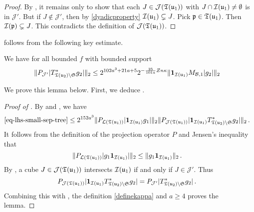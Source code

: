     \begin{proof}\leanok
        By , it remains only to show that each $J \in \mathcal{J}({\mathfrak T}({\mathfrak u}_1))$ with $J \cap {\mathcal{I}}({\mathfrak u}_1) \ne \emptyset$ is in $\mathcal{J}'$. But if $J \notin \mathcal{J}'$, then by \eqref{dyadicproperty} ${\mathcal{I}}({\mathfrak u}_1) \subsetneq J$. Pick ${\mathfrak p} \in {\mathfrak T}({\mathfrak u}_1)$. Then ${\mathcal{I}}({\mathfrak p}) \subsetneq J$. This contradicts the definition of $\mathcal{J}({\mathfrak T}({\mathfrak u}_1))$.
    \end{proof}

     follows from the following key estimate.

    \begin{lemma}
        \label{bound-for-tree-projection}
        \leanok
        We have for all bounded $f$ with bounded support
        $$
            \|P_{\mathcal{J}'}|T_{{\mathfrak T}({\mathfrak u}_2) \setminus \mathfrak{S}}^* g_2|\|_2
            \le 2^{102a^3+21a+5} 2^{-\frac{25}{101a}Zn\kappa} \|\mathbf{1}_{{\mathcal{I}}({\mathfrak u}_1)} M_{\mathcal{B},1} |g_2|\|_2
        $$
    \end{lemma}

    We prove this lemma below. First, we deduce .

    \begin{proof}[Proof of ]
        \leanok
        By  and , we have
        \begin{align*}
            \eqref{eq-lhs-small-sep-tree} \le 2^{152a^3} \|P_{\mathcal{L}({\mathfrak T}({\mathfrak u}_1))} |\mathbf{1}_{{\mathcal{I}}({\mathfrak u}_1)}g_1| \|_2 \|P_{\mathcal{J}({\mathfrak T}({\mathfrak u}_1) )}|\mathbf{1}_{{\mathcal{I}}({\mathfrak u}_1)} T_{{\mathfrak T}({\mathfrak u}_2) \setminus \mathfrak{S}}^* g_2|\|_2\,.
        \end{align*}
        It follows from the definition of the projection operator $P$ and Jensen's inequality that
        $$
            \|P_{\mathcal{L}({\mathfrak T}({\mathfrak u}_1))} |g_1\mathbf{1}_{{\mathcal{I}}({\mathfrak u}_1)}| \|_2 \le \|g_1 \mathbf{1}_{{\mathcal{I}}({\mathfrak u}_1)}\|_2\,.
        $$
        By , a cube $J \in \mathcal{J}({\mathfrak T}({\mathfrak u}_1))$ intersects ${\mathcal{I}}({\mathfrak u}_1)$ if and only if $J \in \mathcal{J}'$. Thus
        $$
            P_{\mathcal{J}({\mathfrak T}({\mathfrak u}_1) )}|\mathbf{1}_{{\mathcal{I}}({\mathfrak u}_1)} T_{{\mathfrak T}({\mathfrak u}_2) \setminus \mathfrak{S}}^* g_2| = P_{\mathcal{J}'}|T_{{\mathfrak T}({\mathfrak u}_2) \setminus \mathfrak{S}}^* g_2|\,.
        $$
        Combining this with , the definition \eqref{definekappa} and $a \ge 4$ proves the lemma.
    \end{proof}

